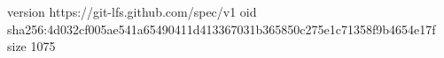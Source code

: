 version https://git-lfs.github.com/spec/v1
oid sha256:4d032cf005ae541a65490411d413367031b365850c275e1c71358f9b4654e17f
size 1075
